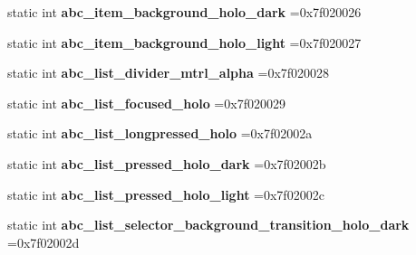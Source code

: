 \begin{DoxyCompactItemize}
\item 
\mbox{\label{classandroid_1_1support_1_1v4_1_1R_1_1drawable_aef711ea2ccd1a66c9cb99102368eafc2}} 
static int {\bfseries abc\+\_\+item\+\_\+background\+\_\+holo\+\_\+dark} =0x7f020026
\item 
\mbox{\label{classandroid_1_1support_1_1v4_1_1R_1_1drawable_ac7f67031b312fe26ce0eddeb10c103c8}} 
static int {\bfseries abc\+\_\+item\+\_\+background\+\_\+holo\+\_\+light} =0x7f020027
\item 
\mbox{\label{classandroid_1_1support_1_1v4_1_1R_1_1drawable_ac643dd5e01fc7a853b4d30ea027a712e}} 
static int {\bfseries abc\+\_\+list\+\_\+divider\+\_\+mtrl\+\_\+alpha} =0x7f020028
\item 
\mbox{\label{classandroid_1_1support_1_1v4_1_1R_1_1drawable_a7ee6e6518d1dee60c8a461c1816645a4}} 
static int {\bfseries abc\+\_\+list\+\_\+focused\+\_\+holo} =0x7f020029
\item 
\mbox{\label{classandroid_1_1support_1_1v4_1_1R_1_1drawable_a49ae29dc5b2386c3d285b89e9cec0058}} 
static int {\bfseries abc\+\_\+list\+\_\+longpressed\+\_\+holo} =0x7f02002a
\item 
\mbox{\label{classandroid_1_1support_1_1v4_1_1R_1_1drawable_a3598634908f056c7cd98c6a05063798c}} 
static int {\bfseries abc\+\_\+list\+\_\+pressed\+\_\+holo\+\_\+dark} =0x7f02002b
\item 
\mbox{\label{classandroid_1_1support_1_1v4_1_1R_1_1drawable_af8b19a97b390d33fe12a0a01b6a96f7a}} 
static int {\bfseries abc\+\_\+list\+\_\+pressed\+\_\+holo\+\_\+light} =0x7f02002c
\item 
\mbox{\label{classandroid_1_1support_1_1v4_1_1R_1_1drawable_a9e17e7665cc98f30478c223cac533e9a}} 
static int {\bfseries abc\+\_\+list\+\_\+selector\+\_\+background\+\_\+transition\+\_\+holo\+\_\+dark} =0x7f02002d
\item 

\end{DoxyCompactItemize}
